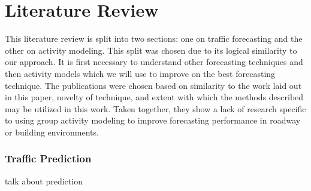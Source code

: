 \chapter{Literature Review}
	This literature review is split into two sections: one on traffic forecasting and the other on activity modeling.  This split was chosen due to its logical similarity to our approach.  It is first necessary to understand other forecasting techniques and then activity models which we will use to improve on the best forecasting technique.  The publications were chosen based on similarity to the work laid out in this paper, novelty of technique, and extent with which the methods described may be utilized in this work.  Taken together, they show a lack of research specific to using group activity modeling to improve forecasting performance in roadway or building environments.

\subsection{Traffic Prediction}
talk about prediction

